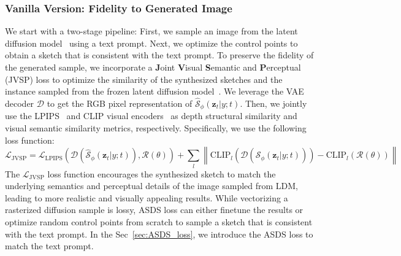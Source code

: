 \documentclass{article}
\begin{document}
\subsubsection{Vanilla Version: Fidelity to Generated Image}
\label{sec:vanilla_version}
We start with a two-stage pipeline: First, we sample an image from the latent diffusion model~\cite{ldm_2022_Rombach} using a text prompt. Next, we optimize the control points to obtain a sketch that is consistent with the text prompt. 
To preserve the fidelity of the generated sample, we incorporate a \textbf{J}oint \textbf{V}isual \textbf{S}emantic and \textbf{P}erceptual (JVSP) loss to optimize the similarity of the synthesized sketches and the instance sampled from the frozen latent diffusion model~\cite{ldm_2022_Rombach}.
We leverage the VAE~\cite{taming_2021_esser} decoder $\mathcal{D}$ to get the RGB pixel representation of $\hat{\mathcal{S}}_{\phi}(\mathbf{z}_t|y;t)$.
Then, we jointly use the LPIPS~\cite{lpips_zhang_2018} and CLIP visual encoders~\cite{clip_radford_2021,vinker_2022_clipasso} as depth structural similarity and visual semantic similarity metrics, respectively.
Specifically, we use the following loss function:
\begin{equation}
\mathcal{L}_{\mathrm{JVSP}} = 
\mathcal{L}_{\mathrm{LPIPS}}(\mathcal{D}(\hat{\mathcal{S}}_{\phi}(\mathbf{z}_t|y;t)), \mathcal{R}(\theta)) + 
\sum_l \left\| \mathrm{CLIP}_l (\mathcal{D}(\hat{\mathcal{S}}_{\phi}(\mathbf{z}_t|y;t))) - \mathrm{CLIP}_l (\mathcal{R}(\theta)) \right\|
\end{equation}
The $\mathcal{L}_{\mathrm{JVSP}}$ loss function encourages the synthesized sketch to match the underlying semantics and perceptual details of the image sampled from LDM, leading to more realistic and visually appealing results.
While vectorizing a rasterized diffusion sample is lossy, ASDS loss can either finetune the results or optimize random control points from scratch to sample a sketch that is consistent with the text prompt.
In the Sec~\ref{sec:ASDS_loss}, we introduce the ASDS loss to match the text prompt.
\end{document}
